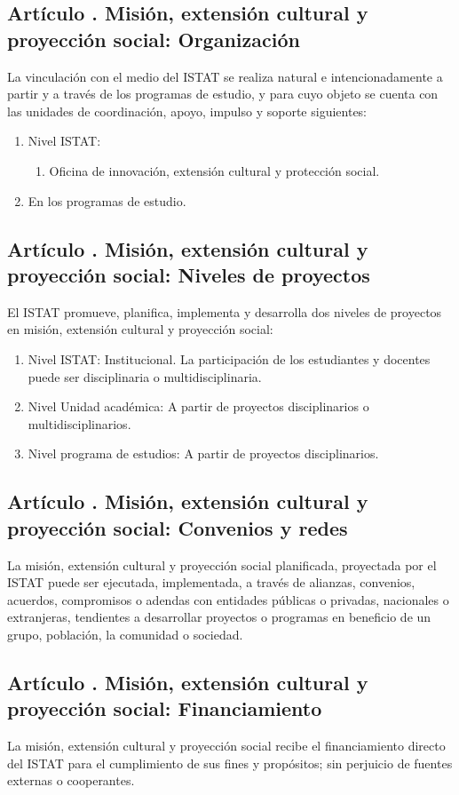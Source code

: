 \subsection{Artículo . Misión, extensión cultural y proyección social: Organización}
\addtocounter{ns}{1}
La vinculación con el medio del ISTAT se realiza natural e intencionadamente a partir y a través de los programas de estudio, y para cuyo objeto se cuenta con las unidades de coordinación, apoyo, impulso y soporte siguientes:   
\begin{enumerate}
\item Nivel ISTAT: 
	\begin{enumerate}
		\item Oficina de innovación, extensión cultural y protección social.
	\end{enumerate}
\item En los programas de estudio.
\end{enumerate}
\subsection{Artículo . Misión, extensión cultural y proyección social: Niveles de proyectos}
\addtocounter{ns}{1}
El ISTAT promueve, planifica, implementa y desarrolla dos niveles de proyectos en misión, extensión cultural y proyección social: 
\begin{enumerate}
\item Nivel ISTAT: Institucional. La participación de los estudiantes y docentes puede ser disciplinaria o multidisciplinaria. 
\item Nivel Unidad académica: A partir de proyectos disciplinarios o multidisciplinarios. 
\item Nivel programa de estudios: A partir de proyectos disciplinarios.  
\end{enumerate}
\subsection{Artículo . Misión, extensión cultural y proyección social: Convenios y redes}
\addtocounter{ns}{1}
La misión, extensión cultural y proyección social planificada, proyectada por el ISTAT puede ser ejecutada, implementada, a través de alianzas, convenios, acuerdos, compromisos o adendas con entidades públicas o privadas, nacionales o extranjeras, tendientes a desarrollar proyectos o programas en beneficio de un grupo, población, la comunidad o sociedad.  
\subsection{Artículo . Misión, extensión cultural y proyección social: Financiamiento}
\addtocounter{ns}{1}
La misión, extensión cultural y proyección social recibe el financiamiento directo del ISTAT para el cumplimiento de sus fines y propósitos; sin perjuicio de fuentes externas o cooperantes.  
